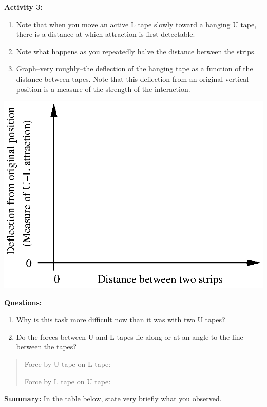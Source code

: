 \textbf{Activity 3:}

\begin{enumerate}
\item Note that when you move an active L tape slowly toward a hanging U
tape, there is a distance at which attraction is first detectable.
\item Note what happens as you repeatedly halve the distance between the
strips.\vspace{15mm}

\item Graph--very roughly--the deflection of the hanging tape as a function
of the distance between tapes. Note that this deflection from an original
vertical position is a measure of the strength of the interaction.
\end{enumerate}
\vspace{0.3cm}
{\centering \includegraphics{int_elec_charges_fig_3.eps} \par}
\vspace{0.3cm}

\textbf{Questions:}

\begin{enumerate}
\item Why is this task more difficult now than it was with two U tapes?\vspace{15mm}

\item Do the forces between U and L tapes lie along or at an angle to the
line between the tapes?
\end{enumerate}
\begin{quotation}
Force by U tape on L tape:
\vspace{10mm}

Force by L tape on U tape:\vspace{10mm}

\end{quotation}
\textbf{Summary:} In the table below, state very briefly what you
observed.

